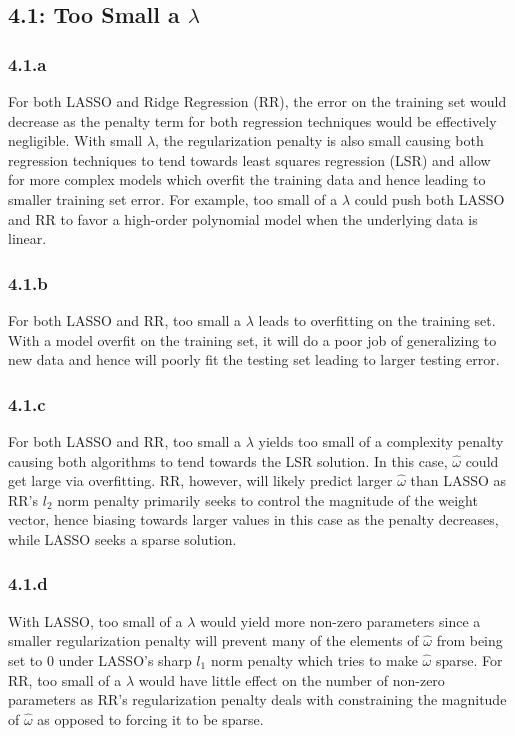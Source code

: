 \documentclass[12pt]{amsart}
\begin{document}
\subsection*{4.1: Too Small a $\lambda$}
\subsubsection*{4.1.a}
For both LASSO and Ridge Regression (RR), the error on the training set would decrease as the penalty term for both regression techniques would be effectively negligible.  With small $\lambda$, the regularization penalty is also small causing both regression techniques to tend towards least squares regression (LSR) and allow for more complex models which overfit the training data and hence leading to smaller training set error.  For example, too small of a $\lambda$ could push both LASSO and RR to favor a high-order polynomial model when the underlying data is linear.

\subsubsection*{4.1.b}
For both LASSO and RR, too small a $\lambda$ leads to overfitting on the training set.  With a model overfit on the training set, it will do a poor job of generalizing to new data and hence will poorly fit the testing set leading to larger testing error.

\subsubsection*{4.1.c}
For both LASSO and RR, too small a $\lambda$ yields too small of a complexity penalty causing both algorithms to tend towards the LSR solution.  In this case, $\hat{\omega}$ could get large via overfitting.  RR, however, will likely predict larger $\hat{\omega}$ than LASSO as RR's $l_2$ norm penalty primarily seeks to control the magnitude of the weight vector, hence biasing towards larger values in this case as the penalty decreases, while LASSO seeks a sparse solution.


\subsubsection*{4.1.d}
With LASSO, too small of a $\lambda$ would yield more non-zero parameters since a smaller regularization penalty will prevent many of the elements of $\hat{\omega}$ from being set to 0 under LASSO's sharp $l_1$ norm penalty which tries to make $\hat{\omega}$ sparse.  For RR, too small of a $\lambda$ would have little effect on the number of non-zero parameters as RR's regularization penalty deals with constraining the magnitude of $\hat{\omega}$ as opposed to forcing it to be sparse.
\end{document}
